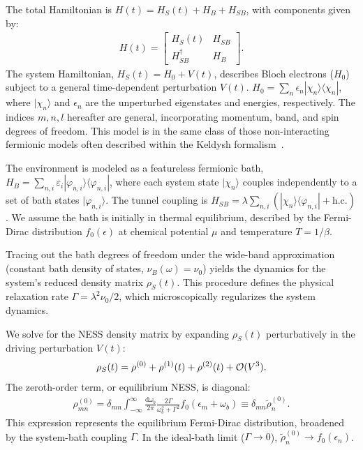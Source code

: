\documentclass[twocolumn, prx, reprint, amsfonts, amsmath, amssymb, longbibliography, floatfix, aps]{revtex4-2}
\begin{document}
The total Hamiltonian is $H(t) = H_S(t) + H_B + H_{SB}$, with components given by:
\begin{align}
H (t) = \begin{bmatrix}
H_S (t) & H_{SB} \\
H_{SB}^\dagger & H_B
\end{bmatrix} .
\end{align}
The system Hamiltonian, $H_S(t) = H_0 + V(t)$, describes Bloch electrons ($H_0$) subject to a general time-dependent perturbation $V(t)$. $H_0 = \sum_n \epsilon_n |\chi_n\rangle\langle \chi_n|$, where $|\chi_n\rangle$ and $\epsilon_n$ are the unperturbed eigenstates and energies, respectively. The indices $m, n, l$ hereafter are general, incorporating momentum, band, and spin degrees of freedom. This model is in the same class of those non-interacting fermionic models often described within the Keldysh formalism~\cite{nagaosa2017concept,gerchikov1989theory,fregoso2013driven,kamenev2011field,johnsen1999quasienergy,jauho1994time,kohler2005driven,matsyshyn2021rabi}.

The environment is modeled as a featureless fermionic bath, $H_B = \sum_{n, i} \varepsilon_i |\varphi_{n,i}\rangle\langle \varphi_{n,i}|$, where each system state $|\chi_n\rangle$ couples independently to a set of bath states $|\varphi_{n,i}\rangle$. The tunnel coupling is $H_{SB} = \lambda \sum_{n, i} (|\chi_{n}\rangle\langle \varphi_{n, i} | + \text{h.c.})$. We assume the bath is initially in thermal equilibrium, described by the Fermi-Dirac distribution $f_0(\epsilon)$ at chemical potential $\mu$ and temperature $T=1/\beta$.

Tracing out the bath degrees of freedom under the wide-band approximation (constant bath density of states, $\nu_B(\omega) = \nu_0$) yields the dynamics for the system's reduced density matrix $\rho_S(t)$. This procedure defines the physical relaxation rate $\Gamma = \lambda^2 \nu_0/2$, which microscopically regularizes the system dynamics. 

We solve for the NESS density matrix by expanding $\rho_S(t)$ perturbatively in the driving perturbation $V(t)$:
\begin{align}
\rho_S(t) = \rho^{(0)} + \rho^{(1)}(t) + \rho^{(2)}(t) + {\cal O}(V^3).
\end{align}
The zeroth-order term, or equilibrium NESS, is diagonal:
\begin{align}
\rho_{m n}^{(0)} = \delta_{m n}
\int_{-\infty}^{\infty} \frac{\text{d} \omega_b}{2 \pi}
\frac{ 2 \Gamma }
{\omega_b^2 + \Gamma^2}
f_0(\epsilon_{m} + \omega_b) \equiv \delta_{mn} \tilde{\rho}_n^{(0)}.
\label{eq:SM_rho0}
\end{align}
This expression represents the equilibrium Fermi-Dirac distribution, broadened by the system-bath coupling $\Gamma$. In the ideal-bath limit ($\Gamma \to 0$), $\tilde{\rho}_n^{(0)} \to f_0(\epsilon_n)$.
\end{document}
